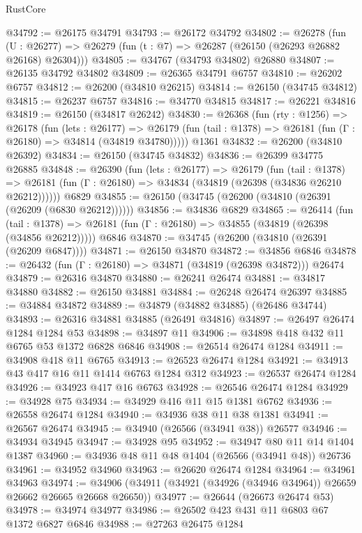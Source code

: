 \begin{lexlean}{RustCore}
\begin{coremodule}
@34792 := @26175 @34791
@34793 := @26172 @34792
@34802 := @26278
    (fun (U : @26277) => @26279 (fun (t : @7) => @26287 (@26150 (@26293 @26882 @26168) @26304)))
@34805 := @34767 (@34793 @34802) @26880
@34807 := @26135 @34792 @34802
@34809 := @26365 @34791 @6757
@34810 := @26202 @6757
@34812 := @26200 (@34810 @26215)
@34814 := @26150 (@34745 @34812)
@34815 := @26237 @6757
@34816 := @34770 @34815
@34817 := @26221 @34816
@34819 := @26150 (@34817 @26242)
@34830 := @26368
    (fun (rty : @1256) =>
    @26178
      (fun (lets : @26177) =>
      @26179 (fun (tail : @1378) => @26181 (fun (Γ : @26180) => @34814 (@34819 @34780)))))
    @1361
@34832 := @26200 (@34810 @26392)
@34834 := @26150 (@34745 @34832)
@34836 := @26399 @34775 @26885
@34848 := @26390
    (fun (lets : @26177) =>
    @26179
      (fun (tail : @1378) =>
      @26181 (fun (Γ : @26180) => @34834 (@34819 (@26398 (@34836 @26210 @26212))))))
    @6829
@34855 := @26150 (@34745 (@26200 (@34810 (@26391 (@26209 (@6830 @26212))))))
@34856 := @34836 @6829
@34865 := @26414
    (fun (tail : @1378) => @26181 (fun (Γ : @26180) => @34855 (@34819 (@26398 (@34856 @26212)))))
    @6846
@34870 := @34745 (@26200 (@34810 (@26391 (@26209 @6847))))
@34871 := @26150 @34870
@34872 := @34856 @6846
@34878 := @26432 (fun (Γ : @26180) => @34871 (@34819 (@26398 @34872))) @26474
@34879 := @26316 @34870
@34880 := @26241 @26474
@34881 := @34817 @34880
@34882 := @26150 @34881
@34884 := @26248 @26474 @26397
@34885 := @34884 @34872
@34889 := @34879 (@34882 @34885) (@26486 @34744)
@34893 := @26316 @34881 @34885 (@26491 @34816)
@34897 := @26497 @26474 @1284 @1284 @53
@34898 := @34897 @11
@34906 := @34898 @418 @432 @11 @6765 @53 @1372 @6828 @6846
@34908 := @26514 @26474 @1284
@34911 := @34908 @418 @11 @6765
@34913 := @26523 @26474 @1284
@34921 := @34913 @43 @417 @16 @11 @1414 @6763 @1284 @312
@34923 := @26537 @26474 @1284
@34926 := @34923 @417 @16 @6763
@34928 := @26546 @26474 @1284
@34929 := @34928 @75
@34934 := @34929 @416 @11 @15 @1381 @6762
@34936 := @26558 @26474 @1284
@34940 := @34936 @38 @11 @38 @1381
@34941 := @26567 @26474
@34945 := @34940 (@26566 (@34941 @38)) @26577
@34946 := @34934 @34945
@34947 := @34928 @95
@34952 := @34947 @80 @11 @14 @1404 @1387
@34960 := @34936 @48 @11 @48 @1404 (@26566 (@34941 @48)) @26736
@34961 := @34952 @34960
@34963 := @26620 @26474 @1284
@34964 := @34961 @34963
@34974 := @34906 (@34911 (@34921 (@34926 (@34946 @34964)) @26659 @26662 @26665 @26668 @26650))
@34977 := @26644 (@26673 @26474 @53)
@34978 := @34974 @34977
@34986 := @26502 @423 @431 @11 @6803 @67 @1372 @6827 @6846
@34988 := @27263 @26475 @1284

\end{coremodule}
\end{lexlean}
